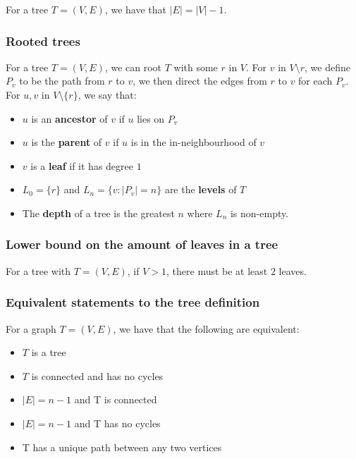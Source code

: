 \documentclass[a4paper, 12pt, twoside]{article}
\begin{document}
For a tree $T = (V, E)$, we have that $|E| = |V| - 1$.

\subsubsection{Rooted trees}

For a tree $T = (V, E)$, we can root $T$ with some $r$ in $V$.
For $v$ in $V\setminus{r}$, we define $P_v$ to be the path from 
$r$ to $v$, we then direct the edges from $r$ to $v$ for each $P_v$.
\\[\baselineskip]
For $u, v$ in $V\setminus\{r\}$, we say that: \begin{itemize}
  \item $u$ is an \textbf{ancestor} of $v$ if $u$ lies on $P_v$
  \item $u$ is the \textbf{parent} of $v$ if $u$ is in the
  in-neighbourhood of $v$
  \item $v$ is a \textbf{leaf} if it has degree $1$
  \item $L_0 = \{r\}$ and $L_n = \{v : |P_v| = n\}$ are the 
  \textbf{levels} of $T$
  \item The \textbf{depth} of a tree is the greatest $n$ where
  $L_n$ is non-empty.
\end{itemize} 

\subsubsection{Lower bound on the amount of leaves in a tree}

For a tree with $T = (V, E)$, if $V > 1$, there must be at least
$2$ leaves.

\subsubsection{Equivalent statements to the tree definition}

For a graph $T = (V, E)$, we have that the following are
equivalent: \begin{itemize}
  \item $T$ is a tree
  \item $T$ is connected and has no cycles
  \item $|E| = n - 1$ and T is connected
  \item $|E| = n - 1$ and T has no cycles
  \item T has a unique path between any two vertices
\end{itemize}
\end{document}
